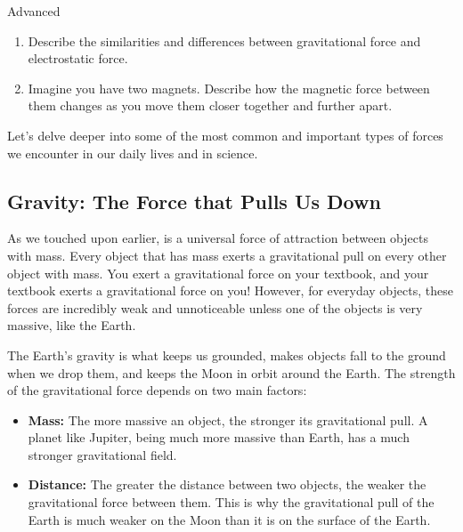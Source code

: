 \begin{tieredquestions}{Advanced}
\begin{enumerate}
    \item  Describe the similarities and differences between gravitational force and electrostatic force.
    \item  Imagine you have two magnets. Describe how the magnetic force between them changes as you move them closer together and further apart.
\end{enumerate}
\end{tieredquestions}


\FloatBarrier
\1

Let's delve deeper into some of the most common and important types of forces we encounter in our daily lives and in science.

\subsection{Gravity: The Force that Pulls Us Down}

\begin{marginnote}
\end{marginnote}
As we touched upon earlier,  is a universal force of attraction between objects with mass.  Every object that has mass exerts a gravitational pull on every other object with mass.  You exert a gravitational force on your textbook, and your textbook exerts a gravitational force on you!  However, for everyday objects, these forces are incredibly weak and unnoticeable unless one of the objects is very massive, like the Earth.

The Earth's gravity is what keeps us grounded, makes objects fall to the ground when we drop them, and keeps the Moon in orbit around the Earth.  The strength of the gravitational force depends on two main factors:

\begin{itemize}
    \item \textbf{Mass:} The more massive an object, the stronger its gravitational pull.  A planet like Jupiter, being much more massive than Earth, has a much stronger gravitational field.
    \item \textbf{Distance:}  The greater the distance between two objects, the weaker the gravitational force between them.  This is why the gravitational pull of the Earth is much weaker on the Moon than it is on the surface of the Earth.
\end{itemize}

